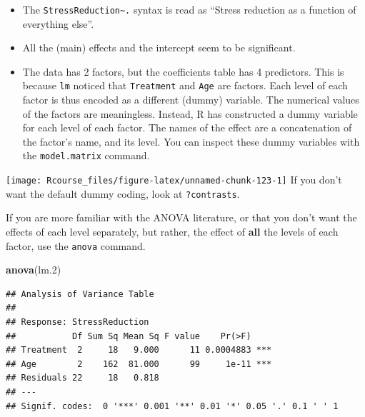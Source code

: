 \documentclass[]{book}
\newenvironment{Shaded}{\begin{snugshade}}{\end{snugshade}}
\newcommand{\KeywordTok}[1]{\textcolor[rgb]{0.13,0.29,0.53}{\textbf{#1}}}
\newcommand{\DecValTok}[1]{\textcolor[rgb]{0.00,0.00,0.81}{#1}}
\newcommand{\StringTok}[1]{\textcolor[rgb]{0.31,0.60,0.02}{#1}}
\newcommand{\OperatorTok}[1]{\textcolor[rgb]{0.81,0.36,0.00}{\textbf{#1}}}
\newcommand{\NormalTok}[1]{#1}
\theoremstyle{definition}
\theoremstyle{definition}
\theoremstyle{definition}
\theoremstyle{remark}
\begin{document}
\begin{itemize}
\item
  The \texttt{StressReduction\textasciitilde{}.} syntax is read as
  ``Stress reduction as a function of everything else''.
\item
  All the (main) effects and the intercept seem to be significant.
\item
  The data has 2 factors, but the coefficients table has 4 predictors.
  This is because \texttt{lm} noticed that \texttt{Treatment} and
  \texttt{Age} are factors. Each level of each factor is thus encoded as
  a different (dummy) variable. The numerical values of the factors are
  meaningless. Instead, R has constructed a dummy variable for each
  level of each factor. The names of the effect are a concatenation of
  the factor's name, and its level. You can inspect these dummy
  variables with the \texttt{model.matrix} command.
\end{itemize}

\begin{Shaded}
\end{Shaded}

\texttt{[image: Rcourse\_files/figure-latex/unnamed-chunk-123-1]}
If you don't want the default dummy coding, look at \texttt{?contrasts}.

If you are more familiar with the ANOVA literature, or that you don't
want the effects of each level separately, but rather, the effect of
\textbf{all} the levels of each factor, use the \texttt{anova} command.

\begin{Shaded}
\begin{Highlighting}[]
\KeywordTok{anova}\NormalTok{(lm.}\DecValTok{2}\NormalTok{)}
\end{Highlighting}
\end{Shaded}

\begin{verbatim}
## Analysis of Variance Table
## 
## Response: StressReduction
##           Df Sum Sq Mean Sq F value    Pr(>F)    
## Treatment  2     18   9.000      11 0.0004883 ***
## Age        2    162  81.000      99     1e-11 ***
## Residuals 22     18   0.818                      
## ---
## Signif. codes:  0 '***' 0.001 '**' 0.01 '*' 0.05 '.' 0.1 ' ' 1
\end{verbatim}
\end{document}
